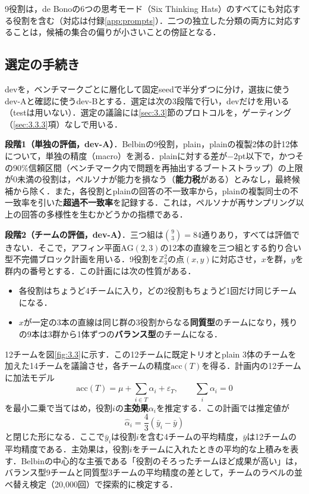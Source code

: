 9役割は，de Bonoの6つの思考モード（Six Thinking Hats）\cite{debono1985six}のすべてにも対応する役割を含む（対応は付録\ref{app:prompts}）．二つの独立した分類の両方に対応することは，候補の集合の偏りが小さいことの傍証となる．

\subsection{選定の手続き}
\label{sec:3.2.2}

devを，ベンチマークごとに層化して固定seedで半分ずつに分け，選抜に使うdev-Aと確認に使うdev-Bとする．選定は次の3段階で行い，devだけを用いる（testは用いない）．選定の議論には\ref{sec:3.3}節のプロトコルを，ゲーティング（\ref{sec:3.3.3}項）なしで用いる．

\textbf{段階1（単独の評価，dev-A）}．Belbinの9役割，plain，plainの複製2体の計12体について，単独の精度（macro）を測る．plainに対する差が$-2$pt以下で，かつその90\%信頼区間（ベンチマーク内で問題を再抽出するブートストラップ）の上限が0未満の役割は，ペルソナが能力を損なう（\textbf{能力税}がある）とみなし，最終候補から除く．また，各役割とplainの回答の不一致率から，plainの複製同士の不一致率を引いた\textbf{超過不一致率}を記録する．これは，ペルソナが再サンプリング以上の回答の多様性を生むかどうかの指標である．

\textbf{段階2（チームの評価，dev-A）}．三つ組は${9 \choose 3} = 84$通りあり，すべては評価できない．そこで，アフィン平面$\mathrm{AG}(2,3)$の12本の直線を三つ組とする釣り合い型不完備ブロック計画を用いる．9役割を$\mathbb{Z}_3^2$の点$(x, y)$に対応させ，$x$を群，$y$を群内の番号とする．この計画には次の性質がある．
\begin{itemize}
\item 各役割はちょうど4チームに入り，どの2役割もちょうど1回だけ同じチームになる．
\item $x$が一定の3本の直線は同じ群の3役割からなる\textbf{同質型}のチームになり，残りの9本は3群から1体ずつの\textbf{バランス型}のチームになる．
\end{itemize}
12チームを図\ref{fig:3.3}に示す．この12チームに既定トリオとplain 3体のチームを加えた14チームを議論させ，各チームの精度$\mathrm{acc}(T)$を得る．計画内の12チームに加法モデル
\begin{equation}
\mathrm{acc}(T) = \mu + \sum_{i \in T} \alpha_i + \varepsilon_T, \qquad \sum_{i} \alpha_i = 0
\label{eq:maineffect}
\end{equation}
を最小二乗で当てはめ，役割$i$の\textbf{主効果}$\alpha_i$を推定する．この計画では推定値が
\begin{equation}
\hat{\alpha}_i = \frac{4}{3} \left( \bar{y}_i - \bar{y} \right)
\label{eq:maineffect_est}
\end{equation}
と閉じた形になる．ここで$\bar{y}_i$は役割$i$を含む4チームの平均精度，$\bar{y}$は12チームの平均精度である．主効果は，役割$i$をチームに入れたときの平均的な上積みを表す．Belbinの中心的な主張である「役割のそろったチームほど成果が高い」は，バランス型9チームと同質型3チームの平均精度の差として，チームのラベルの並べ替え検定（20,000回）で探索的に検定する．

